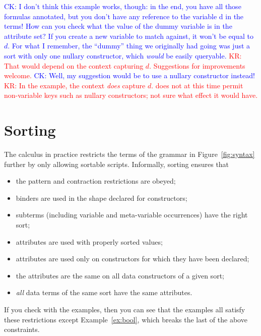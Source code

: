 \documentclass[letterpaper,11pt]{article}
\newcommand{\CK}[1]{\textcolor{blue}{CK: #1}}
\newcommand{\KR}[1]{\textcolor{red}{KR: #1}}
\begin{document}
\begin{example}
  \CK{I don't think this example works, though: in the end, you have all those formulas annotated,
    but you don't have any reference to the variable d in the terms!  How can you check what the
    value of the dummy variable is in the attribute set?  If you create a new variable to match
    against, it won't be equal to $d$.  For what I remember, the ``dummy'' thing we originally had
    going was just a sort with only one nullary constructor, which \emph{would} be easily
    queryable.} \KR{That would depend on the context capturing $d$. Suggestions for improvements
    welcome.} \CK{Well, my suggestion would be to use a nullary constructor instead!} \KR{In the
    example, the context \emph{does} capture $d$. \hax does not at this time permit non-variable
    keys such as nullary constructors; not sure what effect it would have.}
\end{example}



\section{\bhax Sorting}
\label{sec:sorting}

The \hax calculus in practice restricts the terms of the grammar in Figure~\ref{fig:syntax} further
by only allowing sortable scripts. Informally, sorting ensures that
\begin{itemize}
\item the pattern and contraction restrictions are obeyed;
\item binders are used in the shape declared for constructors;
\item subterms (including variable and meta-variable occurrences) have the right sort;
\item attributes are used with properly sorted values;
\item attributes are used only on constructors for which they have been declared;
\item the attributes are the same on all data constructors of a given sort;
\item \emph{all} data terms of the same sort have the same attributes.
\end{itemize}
If you check with the examples, then you can see that the examples all satisfy these restrictions
except Example~\ref{ex:bool}, which breaks the last of the above constraints. 
\end{document}
